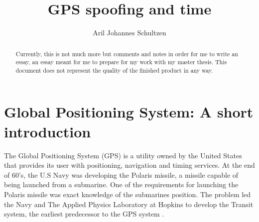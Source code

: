 \documentclass[12pt,english,a4paper]{article}
\title{GPS spoofing and time}
\author{Aril Johannes Schultzen}
\begin{document}
\maketitle
\thispagestyle{empty}
\setcounter{page}{0}
\newpage
\tableofcontents
\thispagestyle{empty}
\setcounter{page}{0}
\newpage
\thispagestyle{empty}
\setcounter{page}{0}

\begin{abstract}
Currently, this is not much more but comments and notes in order for me to write an essay, an essay meant for me to prepare for my work with my master thesis. This document does not represent the quality of the finished product in any way.
\end{abstract}

\newpage
\clearpage
\setcounter{page}{1}

\section{Global Positioning System: A short introduction}
The Global Positioning System (GPS) is a utility owned by the United States that provides its user with positioning, navigation and timing services. At the end of 60's, the U.S Navy was developing the Polaris missile, a missile capable of being launched from a submarine. One of the requirements for launching the Polaris missile was exact knowledge of the submarines position. The problem led the Navy and The Applied Physics Laboratory at Hopkins to develop the Transit system, the earliest predecessor to the GPS system \cite{SteJ}.
\end{document}
